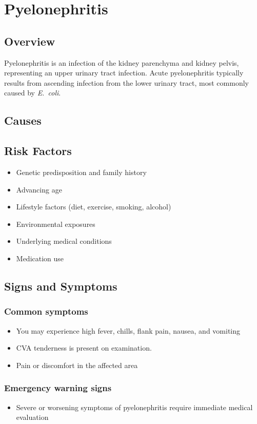 \chapter{Pyelonephritis}
\label{sec:Pyelonephritis}

\section{Overview}
Pyelonephritis is an infection of the kidney parenchyma and kidney pelvis, representing an upper urinary tract infection. Acute pyelonephritis typically results from ascending infection from the lower urinary tract, most commonly caused by \textit{E.~coli}.
\section{Causes}
\section{Risk Factors}

\begin{itemize}[noitemsep]
  \item Genetic predisposition and family history
  \item Advancing age
  \item Lifestyle factors (diet, exercise, smoking, alcohol)
  \item Environmental exposures
  \item Underlying medical conditions
  \item Medication use
\end{itemize}
\section{Signs and Symptoms}

\subsection{Common symptoms}
\begin{itemize}[noitemsep]
  \item You may experience high fever, chills, flank pain, nausea, and vomiting
  \item CVA tenderness is present on examination.
  \item Pain or discomfort in the affected area
  \end{itemize}

\subsection{Emergency warning signs}
\begin{itemize}[noitemsep]
  \item Severe or worsening symptoms of pyelonephritis require immediate medical evaluation
\end{itemize}
